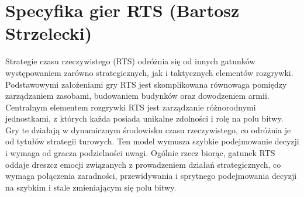 \section{Specyfika gier RTS (Bartosz Strzelecki)}

Strategie czasu rzeczywistego (RTS) odróżnia się od innych gatunków występowaniem zarówno strategicznych, jak i taktycznych
elementów rozgrywki. Podstawowymi założeniami gry RTS jest skomplikowana równowaga pomiędzy zarządzaniem zasobami, budowaniem budynków oraz
dowodzeniem armii. Centralnym elementem rozgrywki RTS jest zarządzanie różnorodnymi jednostkami, z których każda posiada unikalne zdolności i rolę na polu bitwy.
Gry te działają w dynamicznym środowisku czasu rzeczywistego, co odróżnia je od tytułów strategii turowych. Ten model wymusza szybkie podejmowanie decyzji
i wymaga od gracza podzielności uwagi. Ogólnie rzecz biorąc, gatunek RTS oddaje dreszcz emocji związanych z prowadzeniem działań strategicznych, co wymaga połączenia zaradności,
przewidywania i sprytnego podejmowania decyzji na szybkim i stale zmieniającym się polu bitwy.
